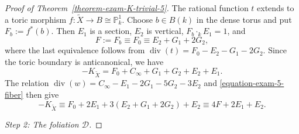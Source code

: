\documentclass[reqno,oneside]{amsart}
\theoremstyle{definition}
\theoremstyle{plain}
\numberwithin{equation}{section}
\begin{document}
\begin{proof}[Proof of Theorem~\ref{theorem-exam-K-trivial-5}]
  The rational function $t$ extends to a toric morphism $f\colon\widetilde X\to B\cong\mathbb P^1_k$.
  Choose $b\in B(k)$ in the dense torus and put $F_b:=f^*(b)$.
  Then $E_1$ is a section, $E_2$ is vertical, $F_b\cdot_kE_1=1$, and
  \begin{equation}\label{equation-exam-5-fiber}
    F:=F_b\equiv F_0\equiv E_2+G_1+2G_2,
  \end{equation}
  where the last equivalence follows from $\operatorname{div}(t)=F_0-E_2-G_1-2G_2$.
  Since the toric boundary is anticanonical, we have \[
    -K_{\widetilde X}=F_0+C_\infty+G_1+G_2+E_2+E_1.
  \]
  The relation
  $\operatorname{div}(w)=C_\infty-E_1-2G_1-5G_2-3E_2$ and
  \eqref{equation-exam-5-fiber} then give
  \begin{equation}\label{equation-exam-5-can}
    -K_{\widetilde X}\equiv
    F_0+2E_1+3(E_2+G_1+2G_2)+E_2
    \equiv 4F+2E_1+E_2.
  \end{equation}
  \medskip
  
  \emph{Step 2: The foliation $\mathcal D$.}
  

\end{proof}
\end{document}
